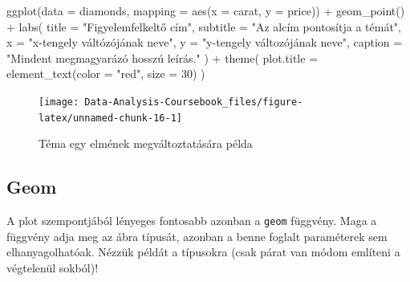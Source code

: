 \documentclass[
]{article}
\newenvironment{Shaded}{\begin{snugshade}}{\end{snugshade}}
\newcommand{\AttributeTok}[1]{\textcolor[rgb]{0.77,0.63,0.00}{#1}}
\newcommand{\DecValTok}[1]{\textcolor[rgb]{0.00,0.00,0.81}{#1}}
\newcommand{\FunctionTok}[1]{\textcolor[rgb]{0.00,0.00,0.00}{#1}}
\newcommand{\NormalTok}[1]{#1}
\newcommand{\SpecialCharTok}[1]{\textcolor[rgb]{0.00,0.00,0.00}{#1}}
\newcommand{\StringTok}[1]{\textcolor[rgb]{0.31,0.60,0.02}{#1}}
\begin{document}
\begin{Shaded}
\begin{Highlighting}[]
\FunctionTok{ggplot}\NormalTok{(}\AttributeTok{data =}\NormalTok{ diamonds, }\AttributeTok{mapping =} \FunctionTok{aes}\NormalTok{(}\AttributeTok{x =}\NormalTok{ carat, }\AttributeTok{y =}\NormalTok{ price)) }\SpecialCharTok{+}
  \FunctionTok{geom\_point}\NormalTok{() }\SpecialCharTok{+}
  \FunctionTok{labs}\NormalTok{(}
    \AttributeTok{title =} \StringTok{"Figyelemfelkeltő cím"}\NormalTok{,}
    \AttributeTok{subtitle =} \StringTok{"Az alcím pontosítja a témát"}\NormalTok{,}
    \AttributeTok{x =} \StringTok{"x{-}tengely váltózójának neve"}\NormalTok{,}
    \AttributeTok{y =} \StringTok{"y{-}tengely változójának neve"}\NormalTok{,}
    \AttributeTok{caption =} \StringTok{"Mindent megmagyarázó hosszú leírás."}
\NormalTok{  ) }\SpecialCharTok{+} 
  \FunctionTok{theme}\NormalTok{(}
    \AttributeTok{plot.title =} \FunctionTok{element\_text}\NormalTok{(}\AttributeTok{color =} \StringTok{"red"}\NormalTok{, }\AttributeTok{size =} \DecValTok{30}\NormalTok{)}
\NormalTok{  )}
\end{Highlighting}
\end{Shaded}

\begin{figure}

{\centering \texttt{[image: Data-Analysis-Coursebook\_files/figure-latex/unnamed-chunk-16-1]} 

}

\caption{Téma egy elmének megváltoztatására példa}\label{fig:unnamed-chunk-16}
\end{figure}

\hypertarget{geom}{%
\subsection{Geom}\label{geom}}

A plot szempontjából lényeges fontosabb azonban a \texttt{geom} függvény. Maga a függvény adja meg az ábra típusát, azonban a benne foglalt paraméterek sem elhanyagolhatóak. Nézzük példát a típusokra (csak párat van módom említeni a végtelenül sokból)!
\end{document}
